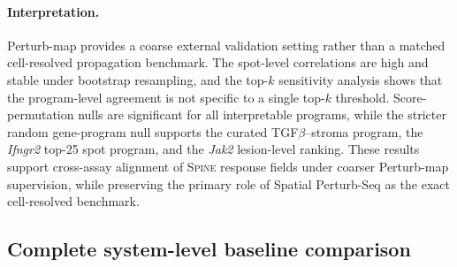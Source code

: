 \documentclass[sigconf,review,balance=false]{acmart}
\newcommand{\methodname}{\textsc{Spine}\xspace}
\begin{document}
\paragraph{Interpretation.}
Perturb-map provides a coarse external validation setting rather than a matched
cell-resolved propagation benchmark. The spot-level correlations are high and stable
under bootstrap resampling, and the top-$k$ sensitivity analysis shows that the
program-level agreement is not specific to a single top-$k$ threshold. Score-permutation
nulls are significant for all interpretable programs, while the stricter random
gene-program null supports the curated TGF$\beta$--stroma program, the \textit{Ifngr2}
top-25 spot program, and the \textit{Jak2} lesion-level ranking. These results support
cross-assay alignment of \methodname{} response fields under coarser Perturb-map
supervision, while preserving the primary role of Spatial Perturb-Seq as the exact
cell-resolved benchmark.





\subsection{Complete system-level baseline comparison}
\label{app:full_baseline_comparison}
\end{document}
